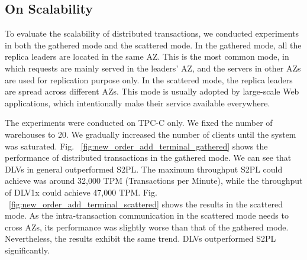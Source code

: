\documentclass[conference]{IEEEtran}
\begin{document}
\subsection{On Scalability}

To evaluate the scalability of distributed transactions, we conducted experiments in both the gathered mode and the scattered mode.
In the gathered mode, all the replica leaders are located in the same AZ. 
This is the most common mode, in which requests are mainly served in the leaders' AZ, and the servers in other AZs are used for replication purpose only. 
In the scattered mode, the replica leaders are spread across different AZs. 
This mode is usually adopted by large-scale Web applications, which intentionally make their service available everywhere.

The experiments were conducted on TPC-C only. We fixed the number of warehouses to 20. We gradually increased the number of clients until the system was saturated. 
Fig. ~\ref{fig:new_order_add_terminal_gathered} shows the performance of distributed transactions in the gathered mode.
We can see that DLVs in general outperformed S2PL. The maximum throughput S2PL could achieve was around 32,000 TPM (Transactions per Minute), 
while the throughput of DLV1x could achieve 47,000 TPM. 
Fig. ~\ref{fig:new_order_add_terminal_scattered} shows the results in the scattered mode. 
As the intra-transaction communication in the scattered mode needs to cross AZs, its performance was slightly worse than that of the gathered mode.
Nevertheless, the results exhibit the same trend. DLVs outperformed S2PL significantly.
\end{document}
